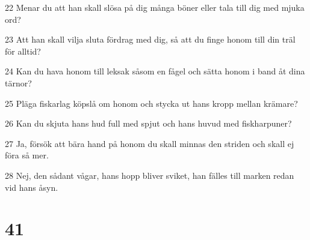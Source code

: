 \par 22 Menar du att han skall slösa på dig många böner eller tala till dig med mjuka ord?
\par 23 Att han skall vilja sluta fördrag med dig, så att du finge honom till din träl för alltid?
\par 24 Kan du hava honom till leksak såsom en fågel och sätta honom i band åt dina tärnor?
\par 25 Pläga fiskarlag köpslå om honom och stycka ut hans kropp mellan krämare?
\par 26 Kan du skjuta hans hud full med spjut och hans huvud med fiskharpuner?
\par 27 Ja, försök att bära hand på honom du skall minnas den striden och skall ej föra så mer.
\par 28 Nej, den sådant vågar, hans hopp bliver sviket, han fälles till marken redan vid hans åsyn.

\chapter{41}

